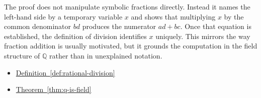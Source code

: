 \begin{remark*}
The proof does not manipulate symbolic fractions directly.  Instead it names
the left-hand side by a temporary variable $x$ and shows that multiplying $x$
by the common denominator $bd$ produces the numerator $ad+bc$.  Once that
equation is established, the definition of division identifies $x$ uniquely.
This mirrors the way fraction addition is usually motivated, but it grounds
the computation in the field structure of $\mathbb{Q}$ rather than in
unexplained notation.
\end{remark*}

\begin{dependencies}
\begin{itemize}
  \item \hyperref[def:rational-division]{Definition~\ref*{def:rational-division}}
  \item \hyperref[thm:q-is-field]{Theorem~\ref*{thm:q-is-field}}
\end{itemize}
\end{dependencies}

\clearpage
